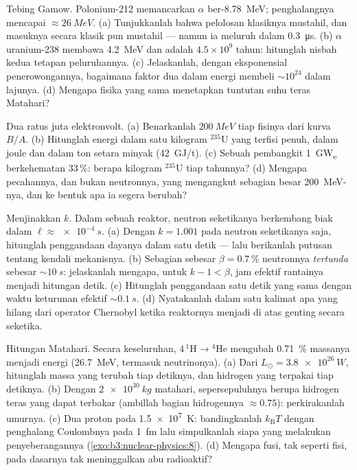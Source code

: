 \begin{exercise}[$\star\star$]\label{exo:b3:nuclear-physics:8}
Tebing Gamow. Polonium-212 memancarkan $\alpha$ ber-\qty{8.78}{MeV};
penghalangnya mencapai $\approx\qty{26}{MeV}$. (a) Tunjukkanlah bahwa pelolosan
klasiknya mustahil, dan masuknya secara klasik pun mustahil --- namun ia meluruh
dalam \qty{0.3}{\micro s}. (b) $\alpha$ uranium-238 membawa
\qty{4.2}{MeV} dan  adalah $4.5\times10^9$ tahun:
hitunglah nisbah kedua tetapan peluruhannya. (c) Jelaskanlah, dengan
eksponensial penerowongannya, bagaimana faktor dua dalam energi membeli
$\sim10^{24}$ dalam lajunya. (d) Mengapa fisika yang sama menetapkan
tuntutan suhu teras Matahari?
\end{exercise}

\begin{exercise}[$\star\star$]\label{exo:b3:nuclear-physics:9}
Dua ratus juta elektronvolt. (a) Benarkanlah
$\qty{200}{MeV}$ tiap fisinya dari kurva $B/A$. (b) Hitunglah
energi dalam satu kilogram $^{235}$U yang terfisi penuh, dalam
joule dan dalam ton setara minyak
(\qty{42}{GJ/t}). (c) Sebuah pembangkit \qty{1}{GW_e} berkehematan 33\,\%:
berapa kilogram $^{235}$U tiap tahunnya? (d) Mengapa
pecahannya, dan bukan neutronnya, yang mengangkut sebagian besar
\qty{200}{MeV}-nya, dan ke bentuk apa ia segera berubah?
\end{exercise}

\begin{exercise}[$\star\star\star$]\label{exo:b3:nuclear-physics:10}
Menjinakkan $k$. Dalam sebuah reaktor, neutron seketikanya berkembang biak dalam $\ell
\approx \qty{e-4}{s}$. (a) Dengan $k = 1.001$ pada neutron seketikanya
saja, hitunglah penggandaan dayanya dalam satu detik --- lalu berikanlah
putusan tentang kendali mekanisnya. (b) Sebagian sebesar $\beta =
0.7\,\%$ neutronnya \emph{tertunda} sebesar $\sim\qty{10}{s}$:
jelaskanlah mengapa, untuk $k - 1 < \beta$, jam efektif rantainya
menjadi hitungan detik. (c) Hitunglah penggandaan satu detik yang sama
dengan waktu keturunan efektif $\sim\qty{0.1}{s}$. (d) Nyatakanlah
dalam satu kalimat apa yang hilang dari operator Chernobyl ketika
reaktornya menjadi di atas genting secara seketika.
\end{exercise}

\begin{exercise}[$\star\star\star$]\label{exo:b3:nuclear-physics:11}
Hitungan Matahari. Secara keseluruhan, $4\,^1\text{H} \to {}^4\text{He}$
mengubah \qty{0.71}{\percent} massanya menjadi energi
(\qty{26.7}{MeV}, termasuk neutrinonya). (a) Dari $L_\odot =
\qty{3.8e26}{W}$, hitunglah massa yang terubah tiap detiknya, dan
hidrogen yang terpakai tiap detiknya. (b) Dengan $\qty{2e30}{kg}$ matahari,
sepersepuluhnya berupa hidrogen teras yang dapat terbakar (ambillah bagian
hidrogennya $\approx0.75$): perkirakanlah umurnya. (c) Dua proton pada
\qty{1.5e7}{K}: bandingkanlah $k_{\text{B}}T$ dengan penghalang Coulombnya
pada \qty{1}{fm} lalu simpulkanlah siapa yang melakukan penyeberangannya
(\cref{exo:b3:nuclear-physics:8}). (d) Mengapa fusi, tak seperti
fisi, pada dasarnya tak meninggalkan abu radioaktif?
\end{exercise}

